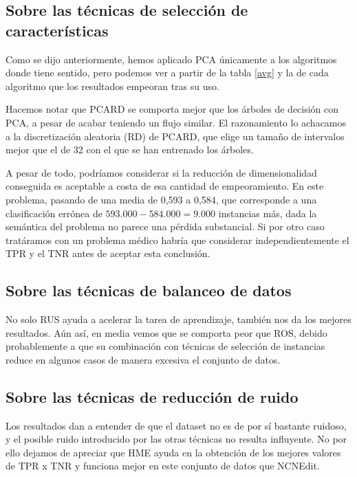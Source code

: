 \newpage

\subsection{Sobre las técnicas de selección de características}

Como se dijo anteriormente, hemos aplicado PCA únicamente a los algoritmos donde tiene sentido, pero podemos ver a partir de la tabla \ref{avg} y la de cada algoritmo que los resultados empeoran tras su uso.

\vspace{\baselineskip}

Hacemos notar que PCARD se comporta mejor que los árboles de decisión con PCA, a pesar de acabar teniendo un flujo similar. El razonamiento lo achacamos a la discretización aleatoria (RD) de PCARD, que elige un tamaño de intervalos mejor que el de 32 con el que se han entrenado los árboles.

\vspace{\baselineskip}

A pesar de todo, podríamos considerar si la reducción de dimensionalidad conseguida es aceptable a costa de esa cantidad de empeoramiento. En este problema, pasando de una media de 0,593 a 0,584, que corresponde a una clasificación errónea de $593.000 - 584.000 = 9.000$ instancias más, dada la semántica del problema no parece una pérdida substancial. Si por otro caso tratáramos con un problema médico habría que considerar independientemente el TPR y el TNR antes de aceptar esta conclusión.

\subsection{Sobre las técnicas de balanceo de datos}

No solo RUS ayuda a acelerar la tarea de aprendizaje, también nos da los mejores resultados. Aún así, en media vemos que se comporta peor que ROS, debido probablemente a que su combinación con técnicas de selección de instancias reduce en algunos casos de manera excesiva el conjunto de datos.

\subsection{Sobre las técnicas de reducción de ruido}

Los resultados dan a entender de que el dataset no es de por sí bastante ruidoso, y el posible ruido introducido por las otras técnicas no resulta influyente. No por ello dejamos de apreciar que HME ayuda en la obtención de los mejores valores de TPR x TNR y funciona mejor en este conjunto de datos que NCNEdit.

